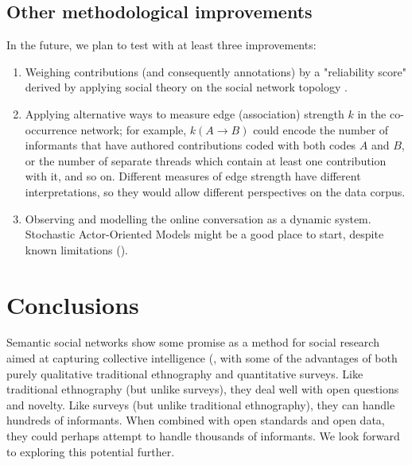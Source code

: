 \documentclass{llncs}
\begin{document}
\subsection{Other methodological improvements}

In the future, we plan to test with at least three improvements:

\begin{enumerate}
\item Weighing contributions (and consequently annotations) by a "reliability score" derived by applying social theory on the social network topology \cite{Burt2005}.
\item Applying alternative ways to measure edge (association) strength $k$ in the co-occurrence network; for example, $k(A \rightarrow B)$ could encode the number of informants that have authored contributions coded with both codes $A$ and $B$, or the number of separate threads which contain at least one contribution with it, and so on. Different measures of edge strength have different interpretations, so they would allow different perspectives on the data corpus. 
\item Observing and modelling the online conversation as a dynamic system. Stochastic Actor-Oriented Models might be a good place to start, despite known limitations (\cite{snijders1996stochastic}).
\end{enumerate}

\section{Conclusions}

Semantic social networks show some promise as a method for social research aimed at capturing collective intelligence (\cite{levy1997collective}, with some of the advantages of both purely qualitative traditional ethnography and quantitative surveys. Like traditional ethnography (but unlike surveys), they deal well with open questions and novelty. Like surveys (but unlike traditional ethnography), they can handle hundreds of informants. When combined with open standards and open data, they could perhaps attempt to handle thousands of informants. We look forward to exploring this potential further.
\end{document}
